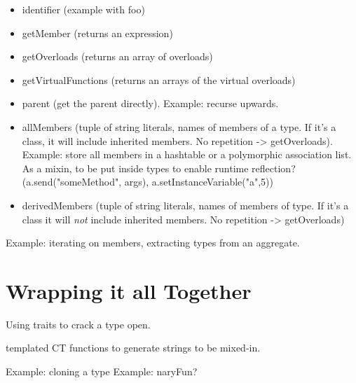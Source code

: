 \begin{itemize}
\item identifier (example with foo)
\item getMember (returns an expression)
\item getOverloads (returns an array of overloads)
\item getVirtualFunctions (returns an arrays of the virtual overloads)
\item parent (get the parent directly). Example: recurse upwards.
\item allMembers (tuple of string literals, names of members of a type. If it's a class, it will include inherited members. No repetition -> getOverloads). Example: store all members in a hashtable or a polymorphic association list. As a mixin, to be put inside types to enable runtime reflection? (a.send("someMethod", args), a.setInstanceVariable("a",5))
\item derivedMembers (tuple of string literals, names of members of type. If it's a class it will \emph{not} include inherited members. No repetition -> getOverloads)
\end{itemize}

Example: iterating on members, extracting types from an aggregate.

\section{Wrapping it all Together}\label{wrappingitup}

Using traits to crack a type open.

templated CT functions to generate strings to be mixed-in.

Example: cloning a type
Example: naryFun?

